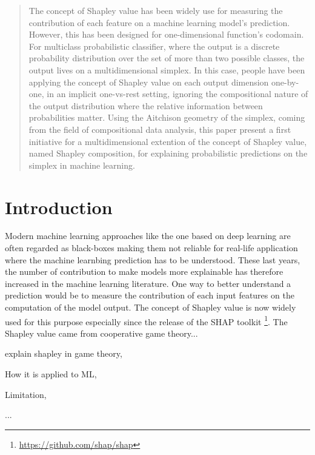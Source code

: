 \documentclass{article}
\theoremstyle{plain}
\theoremstyle{definition}
\theoremstyle{remark}
\begin{document}
\printAffiliationsAndNotice{\icmlEqualContribution} %

\begin{abstract}
  The concept of Shapley value has been widely use for measuring the contribution of each feature on a machine learning model's prediction. However, this has been designed for one-dimensional function's codomain. For multiclass probabilistic classifier, where the output is a discrete probability distribution over the set of more than two possible classes, the output lives on a multidimensional simplex. In this case, people have been applying the concept of Shapley value on each output dimension one-by-one, in an implicit one-vs-rest setting, ignoring the compositional nature of the output distribution where the relative information between probabilities matter. Using the Aitchison geometry of the simplex, coming from the field of compositional data analysis, this paper present a first initiative for a multidimensional extention of the concept of Shapley value, named Shapley composition, for explaining probabilistic predictions on the simplex in machine learning.
\end{abstract}

\section{Introduction}

Modern machine learning approaches like the one based on deep learning are often regarded as black-boxes making them not reliable for real-life application where the machine learnbing prediction has to be understood. These last years, the number of contribution to make models more explainable has therefore increased in the machine learning literature. One way to better understand a prediction would be to measure the contribution of each input features on the computation of the model output. The concept of Shapley value is now widely used for this purpose \cite{vstrumbelj2014explaining,datta2016} especially since the release of the SHAP toolkit \cite{NIPS2017_7062}\footnote{\url{https://github.com/shap/shap}}. The Shapley value came from cooperative game theory...

explain shapley in game theory,

How it is applied to ML,

Limitation,

...
\end{document}
